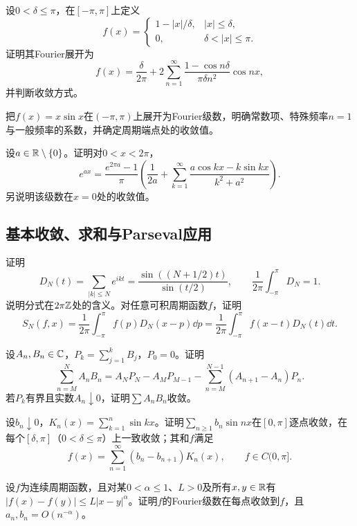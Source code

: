设$0<\delta\le\pi$，在$[-\pi,\pi]$上定义
\[
 f(x)=\begin{cases}1-|x|/\delta,&|x|\le\delta,\\0,&\delta<|x|\le\pi.\end{cases}
\]
证明其Fourier展开为
\[
 f(x)=\frac\delta{2\pi}+2\sum_{n=1}^{\infty}\frac{1-\cos n\delta}{\pi\delta n^2}\cos nx,
\]
并判断收敛方式。

把$f(x)=x\sin x$在$(-\pi,\pi)$上展开为Fourier级数，明确常数项、特殊频率$n=1$与一般频率的系数，并确定周期端点处的收敛值。

设$a\in\mathbb R\setminus\{0\}$。证明对$0<x<2\pi$，
\[
 e^{ax}=\frac{e^{2\pi a}-1}{\pi}
 \left(\frac1{2a}+\sum_{k=1}^{\infty}\frac{a\cos kx-k\sin kx}{k^2+a^2}\right).
\]
另说明该级数在$x=0$处的收敛值。

\subsection*{基本收敛、求和与Parseval应用}

证明
\[
 D_N(t)=\sum_{|k|\le N}e^{ikt}=\frac{\sin((N+1/2)t)}{\sin(t/2)},
 \qquad \frac1{2\pi}\int_{-\pi}^{\pi}D_N=1.
\]
说明分式在$2\pi\mathbb Z$处的含义。对任意可积周期函数$f$，证明
\[
 S_N(f,x)=\frac1{2\pi}\int_{-\pi}^{\pi}f(p)D_N(x-p)\dd p
 =\frac1{2\pi}\int_{-\pi}^{\pi}f(x-t)D_N(t)\dd t.
\]

设$A_n,B_n\in\mathbb C$，$P_k=\sum_{j=1}^kB_j$，$P_0=0$。证明
\[
 \sum_{n=M}^NA_nB_n=A_NP_N-A_MP_{M-1}
 -\sum_{n=M}^{N-1}(A_{n+1}-A_n)P_n.
\]
若$P_k$有界且实数$A_n\downarrow0$，证明$\sum A_nB_n$收敛。

设$b_n\downarrow0$，$K_n(x)=\sum_{k=1}^n\sin kx$。证明$\sum_{n\ge1}b_n\sin nx$在$[0,\pi]$逐点收敛，在每个$[\delta,\pi]$（$0<\delta\le\pi$）上一致收敛；其和$f$满足
\[
 f(x)=\sum_{n=1}^{\infty}(b_n-b_{n+1})K_n(x),\qquad f\in C(0,\pi].
\]

设$f$为连续周期函数，且对某$0<\alpha\le1$、$L>0$及所有$x,y\in\mathbb R$有
$|f(x)-f(y)|\le L|x-y|^\alpha$。证明$f$的Fourier级数在每点收敛到$f$，且$a_n,b_n=O(n^{-\alpha})$。

